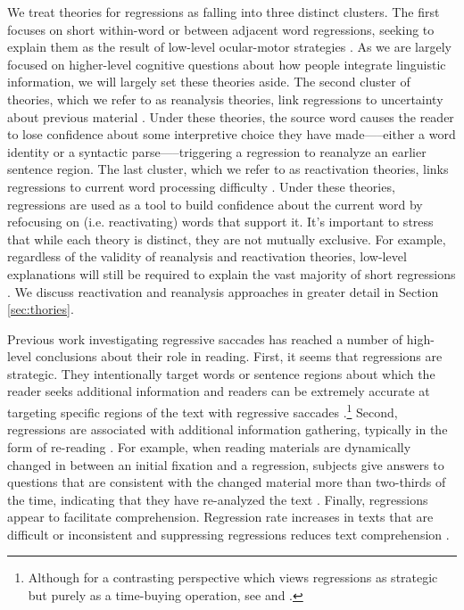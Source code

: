 \documentclass[12pt]{article}
\begin{document}
We treat theories for regressions as falling into three distinct clusters. The first focuses on short within-word or between adjacent word regressions, seeking to explain them as the result of low-level ocular-motor strategies \citep{inhoff2019regressions, o1987eye, yang2001eye}. As we are largely focused on higher-level cognitive questions about how people integrate linguistic information, we will largely set these theories aside. The second cluster of theories, which we refer to as reanalysis theories, link regressions to uncertainty about previous material \citep{frazier1982making, altmann1992avoiding}. Under these theories, the source word causes the reader to lose confidence \citep{bicknell2011readers} about some interpretive choice they have made—--either a word identity or a syntactic parse—--triggering a regression to reanalyze an earlier sentence region. The last cluster, which we refer to as reactivation theories, links regressions to current word processing difficulty \citep{kennedy1987spatial, kennedy2003reader, lopopolo2019dependency}. Under these theories, regressions are used as a tool to build confidence about the current word by refocusing on (i.e. reactivating) words that support it. It’s important to stress that while each theory is distinct, they are not mutually exclusive. For example, regardless of the validity of reanalysis and reactivation theories, low-level explanations will still be required to explain the vast majority of short regressions \citep{inhoff2019regressions}. We discuss reactivation and reanalysis approaches in greater detail in Section \ref{sec:thories}.

Previous work investigating regressive saccades has reached a number of high-level conclusions about their role in reading. First, it seems that regressions are strategic. They intentionally target words or sentence regions about which the reader seeks additional information \citep{rayner1998eye} and readers can be extremely accurate at targeting specific regions of the text with regressive saccades \citep{frazier1982making, kennedy1987spatial, murray1988spatial}.\footnote{Although for a contrasting perspective which views regressions as strategic but purely as a time-buying operation, see \cite{mitchell2008accounting} and \cite{inhoff2005memory}.} Second, regressions are associated with additional information gathering, typically in the form of re-reading \citep{sturt2018processing}. For example, when reading materials are dynamically changed in between an initial fixation and a regression, subjects give answers to questions that are consistent with the changed material more than two-thirds of the time, indicating that they have re-analyzed the text \citep{booth2013function}. Finally, regressions appear to facilitate comprehension. Regression rate increases in texts that are difficult or inconsistent \citep{rayner2006eye} and suppressing regressions reduces text comprehension \citep{schotter2014don}.
\end{document}
